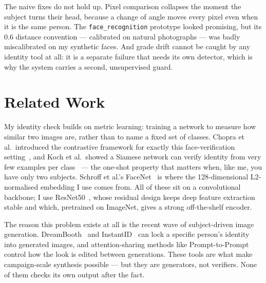 \documentclass[conference]{IEEEtran}
\begin{document}
The naive fixes do not hold up. Pixel comparison collapses the moment the
subject turns their head, because a change of angle moves every pixel even when
it is the same person. The \texttt{face\_recognition} prototype looked
promising, but its 0.6 distance convention --- calibrated on natural
photographs --- was badly miscalibrated on my synthetic faces. And grade drift
cannot be caught by any identity tool at all: it is a separate failure that
needs its own detector, which is why the system carries a second, unsupervised
guard.

\section{Related Work}
\label{sec:related}
%

My identity check builds on metric learning: training a network to measure how
similar two images are, rather than to name a fixed set of classes. Chopra et
al.\ introduced the contrastive framework for exactly this face-verification
setting~\cite{chopra2005contrastive}, and Koch et al.\ showed a Siamese network
can verify identity from very few examples per class~\cite{koch2015siamese} ---
the one-shot property that matters when, like me, you have only two subjects.
Schroff et al.'s FaceNet~\cite{schroff2015facenet} is where the
128-dimensional L2-normalised embedding I use comes from. All of these sit on a
convolutional backbone; I use ResNet50~\cite{he2016resnet}, whose residual
design keeps deep feature extraction stable and which, pretrained on ImageNet,
gives a strong off-the-shelf encoder.

The reason this problem exists at all is the recent wave of subject-driven image
generation. DreamBooth~\cite{ruiz2023dreambooth} and
InstantID~\cite{wang2024instantid} can lock a specific person's identity into
generated images, and attention-sharing methods like
Prompt-to-Prompt~\cite{hertz2022prompt} control how the look is edited between
generations. These tools are what make campaign-scale synthesis possible --- but
they are generators, not verifiers. None of them checks its own output after the
fact.
\end{document}
